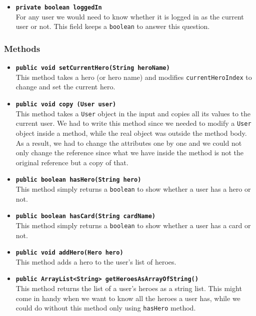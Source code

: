 \documentclass[a4paper]{article}
\begin{document}
\begin{itemize}
	\item \texttt{\textbf{private boolean loggedIn}}\\
	For any user we would need to know whether it is logged in as the current user or not. This field keeps a \texttt{boolean} to answer this question.
	
	
\end{itemize}

\subsubsection{Methods}
\begin{itemize}
	\item \texttt{\textbf{public void setCurrentHero(String heroName)}}\\
	This method takes a hero (or hero name) and modifies \texttt{currentHeroIndex} to change and set the current hero.
	
	\item \texttt{\textbf{public void copy (User user)}}\\
	This method takes a \texttt{User} object in the input and copies all its values to the current user. We had to write this method since we needed to modify a \texttt{User} object inside a method, while the real object was outside the method body. As a result, we had to change the attributes one by one and we could not only change the reference since what we have inside the method is not the original reference but a copy of that.
	
	\item \texttt{\textbf{public boolean hasHero(String hero)}}\\
	This method simply returns a \texttt{boolean} to show whether a user has a hero or not.
	
	\item \texttt{\textbf{public boolean hasCard(String cardName)}}\\
	This method simply returns a \texttt{boolean} to show whether a user has a card or not.	
	
	\item \texttt{\textbf{public void addHero(Hero hero)}}\\
	This method adds a hero to the user's list of heroes.
	
	\item \texttt{\textbf{public ArrayList<String> getHeroesAsArrayOfString()}}\\
	This method returns the list of a user's heroes as a string list. This might come in handy when we want to know all the heroes a user has, while we could do without this method only using \texttt{hasHero} method.
	

\end{itemize}
\end{document}
